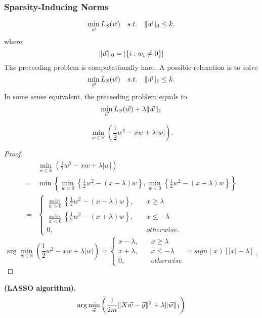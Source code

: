 \subsubsection{Sparsity-Inducing Norms}%

\[
    \min_{\vec{w}} L_{S}(\vec{w})\quad s.t. \quad \Arrowvert \vec{w} \Arrowvert_0 \le k.
\]
where
\[
    \Arrowvert \vec{w} \Arrowvert_0 = \left| \left\{ i: w_i \ne 0 \right\} \right|
\]
The preceeding problem is computationally hard. A possible relaxation is to solve
\[
    \min_{\vec{w}} L_{S}(\vec{w})\quad s.t. \quad \Arrowvert \vec{w} \Arrowvert_1 \le k.
\]
In some sense equivalent, the preceeding problem equals to
\[
     \min_{\vec{w}} L_{S}(\vec{w}) + \lambda \Arrowvert \vec{w} \Arrowvert_1
\]
\begin{example}
    \[
        \min_{w \in \mathbb{R}} \left( \frac{1}{2} w^2 - x w + \lambda \left| w \right| \right).
    \]
    \begin{proof}
        \begin{align*}
            &\min_{w \in \mathbb{R}} \left( \frac{1}{2} w^2 - x w + \lambda \left| w \right| \right)\\
            =&\min \left\{ \min_{w > 0} \left\{ \frac{1}{2} w^2 - (x - \lambda) w \right\}, \min_{w < 0}\left\{ \frac{1}{2} w^2 - (x+\lambda) w \right\} \right\}\\
            =& 
            \begin{cases}
                \min_{w > 0} \left\{ \frac{1}{2} w^2 - (x - \lambda)w \right\},\quad &x \ge \lambda\\
                \min_{w < 0} \left\{ \frac{1}{2} w^2 - (x + \lambda)w \right\}, &x \le -\lambda\\
                0, &otherwise.
            \end{cases}
        \end{align*}
        \[
            \arg\min_{w \in \mathbb{R}} \left( \frac{1}{2} w^2 - x w + \lambda \left| w \right| \right)=
            \begin{cases}
                x - \lambda, \quad &x \ge \lambda\\
                x + \lambda, &x \le -\lambda\\
                0, &otherwise
            \end{cases}
            = sign(x) {\left[ \left| x \right| - \lambda \right]}_+
        \]
    \end{proof}
\end{example}

\begin{definition}
    \textbf{(LASSO algorithm).}
    \[
        \arg\min_{\vec{w}} \left( \frac{1}{2m} { \Arrowvert X \vec{w} - \vec{y} \Arrowvert^2}  + \lambda \Arrowvert \vec{w} \Arrowvert_1\right)
    \]
\end{definition}

